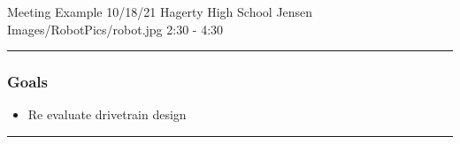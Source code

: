 \insertmeeting 
	{Meeting Example} 
	{10/18/21} 
	{Hagerty High School}
	{Jensen}
	{Images/RobotPics/robot.jpg}
	{2:30 - 4:30}
	
\noindent\hfil\rule{\textwidth}{.4pt}\hfil
\subsubsection*{Goals}
\begin{itemize}
    \item Re evaluate drivetrain design 

\end{itemize} 

\noindent\hfil\rule{\textwidth}{.4pt}\hfil

